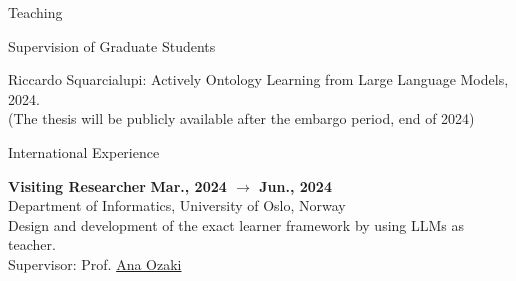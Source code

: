 \documentclass{resume} %
\begin{document}
\begin{rSection}{Teaching}
        \begin{rSubsection2}{Supervision of Graduate Students}

            \item Riccardo Squarcialupi: Actively Ontology Learning from Large Language Models, 2024.
            \\ (The thesis will be publicly available after the embargo period, end of 2024)

        \end{rSubsection2}


        \begin{rSubsection2}{International Experience}

            \item\textbf{ Visiting Researcher }\hfill \textbf{Mar., 2024 $\rightarrow$ Jun., 2024}
            \\Department of Informatics, University of Oslo, Norway
            \\Design and development of the exact learner framework by using LLMs as teacher.
            \\Supervisor: Prof. \href{mailto:anaoz@ifi.uio.no}{Ana Ozaki}

        \end{rSubsection2}

    \end{rSection}

    \newpage

\end{document}
